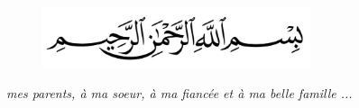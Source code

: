 \hspace{0pt}
\vfill
\begin{figure}[!h]
  \centering
    \includegraphics[width=0.7\textwidth]{FrontBackmatter/5-Ace-Bismilla-Paper-Wall-SDL205996194-1-f9969.jpg}
\end{figure}
\textit{\centering{} mes parents, à ma soeur, à ma fiancée et à ma belle famille ...}
\vfill
\hspace{0pt}
\pagebreak
